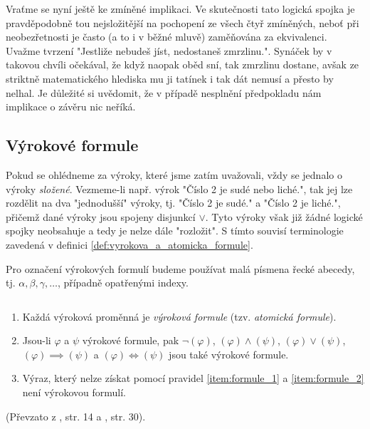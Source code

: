 Vraťme se nyní ještě ke zmíněné implikaci. Ve skutečnosti tato logická spojka je pravděpodobně tou nejsložitější na pochopení ze všech čtyř zmíněných, neboť při neobezřetnosti je často (a to i v běžné mluvě) zaměňována za ekvivalenci. Uvažme tvrzení "Jestliže nebudeš jíst, nedostaneš zmrzlinu.". Synáček by v takovou chvíli očekával, že když naopak oběd sní, tak zmrzlinu dostane, avšak ze striktně matematického hlediska mu ji tatínek i tak dát nemusí a přesto by nelhal. Je důležité si uvědomit, že v případě nesplnění předpokladu nám implikace o závěru nic neříká.\par

\subsection{Výrokové formule}
Pokud se ohlédneme za výroky, které jsme zatím uvažovali, vždy se jednalo o výroky \emph{složené}. Vezmeme-li např. výrok "Číslo 2 je sudé nebo liché.", tak jej lze rozdělit na dva "jednodušší" výroky, tj. "Číslo 2 je sudé." a "Číslo 2 je liché.", přičemž dané výroky jsou spojeny disjunkcí $\lor$. Tyto výroky však již žádné logické spojky neobsahuje a tedy je nelze dále "rozložit". S tímto souvisí terminologie zavedená v definici \ref{def:vyrokova_a_atomicka_formule}.

\begin{convention}
    Pro označení výrokových formulí budeme používat malá písmena řecké abecedy, tj. $\alpha,\beta,\gamma,\dots$, případně opatřenými indexy.
\end{convention}

\begin{definition}\label{def:vyrokova_a_atomicka_formule}
    $ $\par
    \begin{enumerate}[label=(\roman*)]
        \item\label{item:formule_1} Každá výroková proměnná je \emph{výroková formule} (tzv. \emph{atomická formule}).
        \item\label{item:formule_2} Jsou-li $\varphi$ a $\psi$ výrokové formule, pak $\neg (\varphi)$, $(\varphi) \land (\psi)$, $(\varphi) \lor (\psi)$, $(\varphi) \implies (\psi)$ a $(\varphi) \iff (\psi)$ jsou také výrokové formule.
        \item\label{item:formule_3} Výraz, který nelze získat pomocí pravidel \ref{item:formule_1} a \ref{item:formule_2} není výrokovou formulí.
    \end{enumerate}
\end{definition}
(Převzato z \cite{Fuchs2003}, str. 14 a \cite{BalcarStepanek1986}, str. 30).

